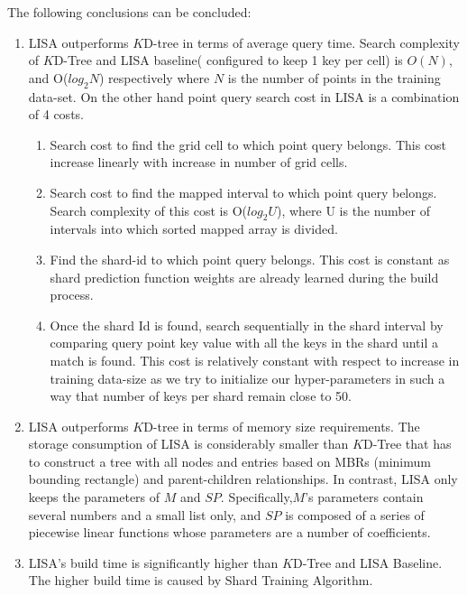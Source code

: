 \begin{mscconclusion}
The following conclusions can be concluded:

	\begin{enumerate}
    \item LISA outperforms $K$D-tree in terms of average query time. Search complexity of $K$D-Tree and LISA baseline( configured to keep 1 key per cell) is $O(N)$, and O($log_{2}N$) respectively where $N$ is the number of points in the training data-set. On the other hand point query search cost in LISA is a combination of 4 costs.
    \begin{enumerate}
    \item Search cost to find the grid cell to which point query belongs. This cost increase linearly with increase in number of grid cells. 
    \item Search cost to find the mapped interval to which point query belongs. Search complexity of this cost is O($log_{2}U$), where U is the number of intervals into which sorted mapped array is divided. 
    
    \item Find the shard-id to which point query belongs. This cost is constant as shard prediction function weights are already learned during the build process. 
    
    \item Once the shard Id is found, search sequentially in the shard interval by comparing query point key value with all the keys in the shard until a match is found. This cost is relatively constant with respect to increase in training data-size as we try to initialize our hyper-parameters in such a way that number of keys per shard remain close to 50. 
\end{enumerate}
    
    \item LISA outperforms $K$D-tree in terms of memory size requirements. The storage consumption of LISA is considerably smaller than $K$D-Tree that has to construct a tree with all nodes and entries based on MBRs (minimum bounding rectangle)  and parent-children relationships. In contrast, LISA only keeps the parameters of $M$ and $SP$. Specifically,$M$’s parameters contain several numbers and a small list only, and $SP$ is composed of a series of piecewise linear functions whose parameters are a number of coefficients.
    
    \item LISA's build time is significantly higher than $K$D-Tree and LISA Baseline. The higher build time is caused by Shard Training Algorithm.  
\end{enumerate}

\end{mscconclusion}

